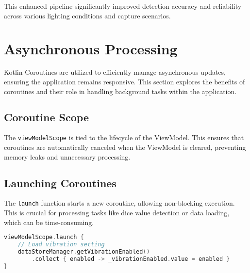 This enhanced pipeline significantly improved detection accuracy and reliability across various lighting conditions and capture scenarios.

\section{Asynchronous Processing}

Kotlin Coroutines are utilized to efficiently manage asynchronous updates, ensuring the application remains responsive. This section explores the benefits of coroutines and their role in handling background tasks within the application.

\subsection{Coroutine Scope}

The \texttt{viewModelScope} is tied to the lifecycle of the ViewModel. This ensures that coroutines are automatically canceled when the ViewModel is cleared, preventing memory leaks and unnecessary processing.

\begin{figure}[ht!]
    \centering
\end{figure} 
\label{fig:lifecycle_viewmodelscope}

\subsection{Launching Coroutines}

The \texttt{launch} function starts a new coroutine, allowing non-blocking execution. This is crucial for processing tasks like dice value detection or data loading, which can be time-consuming.
\begin{lstlisting}[language=Kotlin, caption={Launching a Coroutine}, label=lst:launch_coroutine]
viewModelScope.launch {
    // Load vibration setting
    dataStoreManager.getVibrationEnabled()
        .collect { enabled -> _vibrationEnabled.value = enabled }
}
\end{lstlisting}

